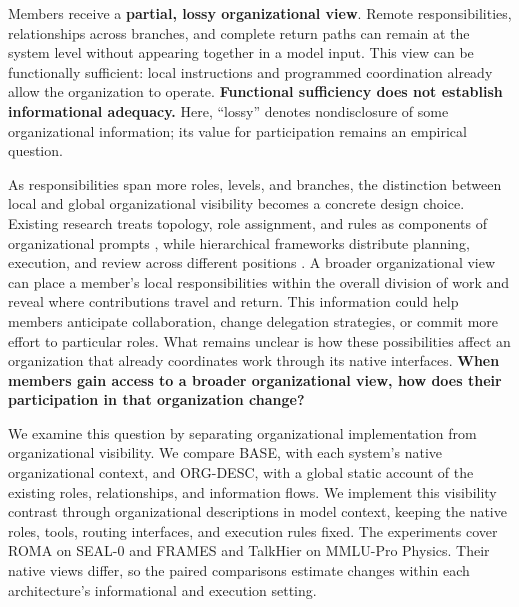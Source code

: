 \documentclass[10pt,letterpaper,twocolumn]{article}
\begin{document}
Members receive a \textbf{partial, lossy or\-ga\-ni\-za\-tion\-al view}. Remote responsibilities, relationships across branches, and complete return paths can remain at the sys\-tem level without appearing together in a mod\-el input. This view can be functionally sufficient: local instructions and programmed coordination already allow the or\-ga\-ni\-za\-tion to operate. \textbf{Functional sufficiency does not establish informational adequacy.} Here, “lossy” denotes nondisclosure of some or\-ga\-ni\-za\-tion\-al in\-for\-ma\-tion; its value for par\-tic\-i\-pa\-tion remains an empirical ques\-tion.

As responsibilities span more roles, levels, and branches, the distinction between local and global or\-ga\-ni\-za\-tion\-al vis\-i\-bil\-i\-ty becomes a concrete design choice. Existing research treats topo\-lo\-gy, role as\-sign\-ment, and rules as components of or\-ga\-ni\-za\-tion\-al prompts \cite{guoorganized}, while hierarchical frame\-works distribute planning, ex\-e\-cu\-tion, and review across dif\-fer\-ent positions \cite{massurvey,orgagent,institutions}. A broad\-er or\-ga\-ni\-za\-tion\-al view can place a member's local responsibilities within the overall division of work and reveal where contributions travel and return. This in\-for\-ma\-tion could help members anticipate col\-lab\-o\-ra\-tion, change del\-e\-ga\-tion strategies, or commit more effort to particular roles. What remains unclear is how these possibilities affect an or\-ga\-ni\-za\-tion that already coordinates work through its na\-tive in\-ter\-faces. \textbf{When members gain access to a broad\-er or\-ga\-ni\-za\-tion\-al view, how does their par\-tic\-i\-pa\-tion in that or\-ga\-ni\-za\-tion change?}

We examine this ques\-tion by separating or\-ga\-ni\-za\-tion\-al implementation from or\-ga\-ni\-za\-tion\-al vis\-i\-bil\-i\-ty. We compare BASE, with each system's native organizational context, and ORG-DESC, with a global static account of the existing roles, relationships, and information flows. We implement this vis\-i\-bil\-i\-ty con\-trast through or\-ga\-ni\-za\-tion\-al de\-scrip\-tions in mod\-el con\-text, keeping the na\-tive roles, tools, routing in\-ter\-faces, and ex\-e\-cu\-tion rules fixed. The experiments cover ROMA on SEAL-0 and FRAMES and TalkHier on MMLU-Pro Phys\-ics. Their na\-tive views differ, so the paired comparisons estimate changes within each ar\-chi\-tec\-ture's informational and ex\-e\-cu\-tion setting.
\end{document}

